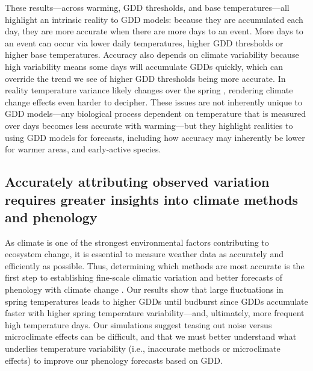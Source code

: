 \documentclass{article}\usepackage[]{graphicx}\usepackage[]{color}
\begin{document}
These results---across warming, GDD thresholds, and base temperatures---all highlight an intrinsic reality to GDD models: because they are accumulated each day, they are more accurate when there are more days to an event. More days to an event can occur via lower daily temperatures, higher GDD thresholds or higher base temperatures. Accuracy also depends on climate variability because high variability means some days will accumulate GDDs quickly, which can override the trend we see of higher GDD thresholds being more accurate. In reality temperature variance likely changes over the spring \citep{Qu2014}, rendering climate change effects even harder to decipher. These issues are not inherently unique to GDD models---any biological process dependent on temperature that is measured over days becomes less accurate with warming---but they highlight realities to using GDD models for forecasts, including how accuracy may inherently be lower for warmer areas, and early-active species. 

\subsection{Accurately attributing observed variation requires greater insights into climate methods and phenology} 
As climate is one of the strongest environmental factors contributing to ecosystem change, it is essential to measure weather data as accurately and efficiently as possible. Thus, determining which methods are most accurate is the first step to establishing fine-scale climatic variation and better forecasts of phenology with climate change \citep{Laigle2021}. Our results show that large fluctuations in spring temperatures leads to higher GDDs until budburst since GDDs accumulate faster with higher spring temperature variability---and, ultimately, more frequent high temperature days. Our simulations suggest teasing out noise versus microclimate effects can be difficult, and that we must better understand what underlies temperature variability (i.e., inaccurate methods or microclimate effects) to improve our phenology forecasts based on GDD. 
  
\end{document}
